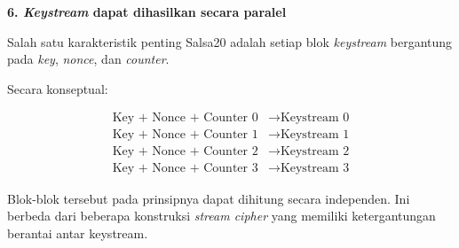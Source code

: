 \documentclass{article}
\begin{document}

\textbf{6. \textit{Keystream} dapat dihasilkan secara paralel}

Salah satu karakteristik penting Salsa20 adalah setiap blok \textit{keystream} bergantung pada \textit{key}, \textit{nonce}, dan \textit{counter}.

Secara konseptual:

\begin{align*}
\text{Key + Nonce + Counter 0} & \rightarrow \text{Keystream 0} \\
\text{Key + Nonce + Counter 1} & \rightarrow \text{Keystream 1} \\
\text{Key + Nonce + Counter 2} & \rightarrow \text{Keystream 2} \\
\text{Key + Nonce + Counter 3} & \rightarrow \text{Keystream 3}
\end{align*}

Blok-blok tersebut pada prinsipnya dapat dihitung secara independen. Ini berbeda dari beberapa konstruksi \textit{stream cipher} yang memiliki ketergantungan berantai antar keystream.
\end{document}
